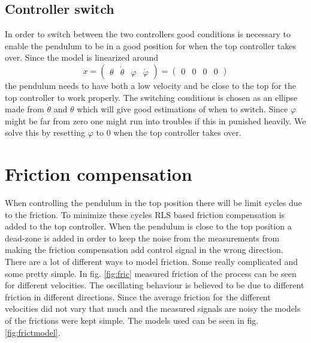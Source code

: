 \documentclass[10pt,a4paper]{article}
\begin{document}
\subsection{Controller switch}
In order to switch between the two controllers good conditions is necessary to enable the pendulum to be in a good position for when the top controller takes over. Since the model is linearized around 
$$x =
\begin{pmatrix}
\theta & \dot\theta & \varphi & \dot\varphi
\end{pmatrix} = 
\begin{pmatrix}
0 & 0 & 0 & 0
\end{pmatrix}$$
the pendulum needs to have both a low velocity and be close to the top for the top controller to work properly. The switching conditions is chosen as an ellipse made from $\dot\theta$ and $\theta$ which will give good estimations of when to switch. Since $ \varphi $ might be far from zero one might run into troubles if this in punished heavily. We solve this by resetting $ \varphi $ to $0$ when the top controller takes over.


\section{Friction compensation}
When controlling the pendulum in the top position there will be limit cycles due to the friction. To minimize these cycles RLS based friction compensation is added to the top controller. When the pendulum is close to the top position a dead-zone is added in order to keep the noise from the measurements from making the friction compensation add control signal in the wrong direction. There are a lot of different ways to model friction. Some really complicated and some pretty simple. In fig. \ref{fig:fric} measured friction of the process can be seen for different velocities. The oscillating behaviour is believed to be due to different friction in different directions. Since the average friction for the different velocities did not vary that much and the measured signals are noisy the models of the frictions were kept simple. The models used can be seen in fig. \ref{fig:frictmodel}. 
\end{document}
